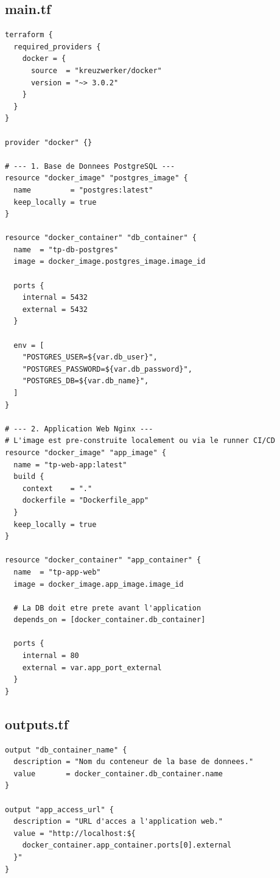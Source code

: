 \documentclass[12pt,a4paper]{article}
\begin{document}
\subsection{main.tf}

\begin{lstlisting}[style=hclStyle, caption=main.tf]
terraform {
  required_providers {
    docker = {
      source  = "kreuzwerker/docker"
      version = "~> 3.0.2"
    }
  }
}

provider "docker" {}

# --- 1. Base de Donnees PostgreSQL ---
resource "docker_image" "postgres_image" {
  name         = "postgres:latest"
  keep_locally = true
}

resource "docker_container" "db_container" {
  name  = "tp-db-postgres"
  image = docker_image.postgres_image.image_id

  ports {
    internal = 5432
    external = 5432
  }

  env = [
    "POSTGRES_USER=${var.db_user}",
    "POSTGRES_PASSWORD=${var.db_password}",
    "POSTGRES_DB=${var.db_name}",
  ]
}

# --- 2. Application Web Nginx ---
# L'image est pre-construite localement ou via le runner CI/CD
resource "docker_image" "app_image" {
  name = "tp-web-app:latest"
  build {
    context    = "."
    dockerfile = "Dockerfile_app"
  }
  keep_locally = true
}

resource "docker_container" "app_container" {
  name  = "tp-app-web"
  image = docker_image.app_image.image_id

  # La DB doit etre prete avant l'application
  depends_on = [docker_container.db_container]

  ports {
    internal = 80
    external = var.app_port_external
  }
}
\end{lstlisting}


\subsection{outputs.tf}

\begin{lstlisting}[style=hclStyle, caption=outputs.tf]
output "db_container_name" {
  description = "Nom du conteneur de la base de donnees."
  value       = docker_container.db_container.name
}

output "app_access_url" {
  description = "URL d'acces a l'application web."
  value = "http://localhost:${
    docker_container.app_container.ports[0].external
  }"
}
\end{lstlisting}
\end{document}

